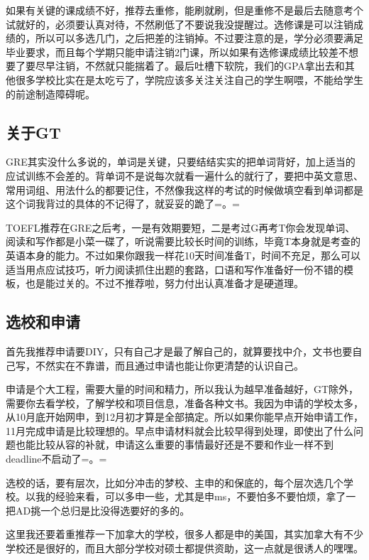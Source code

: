 如果有关键的课成绩不好，推荐去重修，能刷就刷，但是重修不是最后去随意考个试就好的，必须要认真对待，不然刷低了不要说我没提醒过。选修课是可以注销成绩的，所以可以多选几门，之后把差的注销掉。不过要注意的是，学分必须要满足毕业要求，而且每个学期只能申请注销2门课，所以如果有选修课成绩比较差不想要了要尽早注销，不然就只能揣着了。最后吐槽下软院，我们的GPA拿出去和其他很多学校比实在是太吃亏了，学院应该多关注关注自己的学生啊喂，不能给学生的前途制造障碍呢。

\subsection{关于GT}
GRE其实没什么多说的，单词是关键，只要结结实实的把单词背好，加上适当的应试训练不会差的。背单词不是说每次就看一遍什么的就行了，要把中英文意思、常用词组、用法什么的都要记住，不然像我这样的考试的时候做填空看到单词都是这个词我背过的具体的不记得了，就妥妥的跪了=。=\par

TOEFL推荐在GRE之后考，一是有效期要短，二是考过G再考T你会发现单词、阅读和写作都是小菜一碟了，听说需要比较长时间的训练，毕竟T本身就是考查的英语本身的能力。不过如果你跟我一样花10天时间准备T，时间不充足，那么可以适当用点应试技巧，听力阅读抓住出题的套路，口语和写作准备好一份不错的模板，也是能过关的。不过不推荐啦，努力付出认真准备才是硬道理。

\subsection{选校和申请}
首先我推荐申请要DIY，只有自己才是最了解自己的，就算要找中介，文书也要自己写，不然实在不靠谱，而且通过申请也能让你更清楚的认识自己。\par

申请是个大工程，需要大量的时间和精力，所以我认为越早准备越好，GT除外，需要你去看学校，了解学校和项目信息，准备各种文书。我因为申请的学校太多，从10月底开始网申，到12月初才算是全部搞定。所以如果你能早点开始申请工作，11月完成申请是比较理想的。早点申请材料就会比较早得到处理，即使出了什么问题也能比较从容的补就，申请这么重要的事情最好还是不要和作业一样不到deadline不启动了=。=\par

选校的话，要有层次，比如分冲击的梦校、主申的和保底的，每个层次选几个学校。以我的经验来看，可以多申一些，尤其是申ms，不要怕多不要怕烦，拿了一把AD挑一个总归是比没得选要好的多的。\par

这里我还要着重推荐一下加拿大的学校，很多人都是申的美国，其实加拿大有不少学校还是很好的，而且大部分学校对硕士都提供资助，这一点就是很诱人的嘿嘿。

